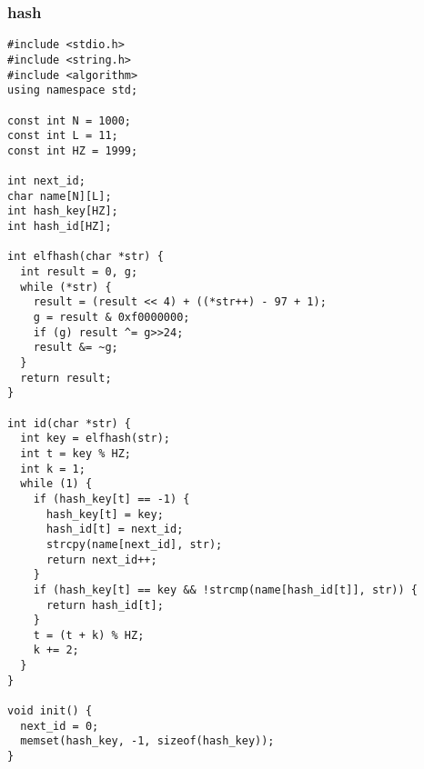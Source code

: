 \subsubsection{hash}
\begin{verbatim}
#include <stdio.h>
#include <string.h>
#include <algorithm>
using namespace std;

const int N = 1000;
const int L = 11;
const int HZ = 1999;

int next_id;
char name[N][L];
int hash_key[HZ];
int hash_id[HZ];

int elfhash(char *str) {
  int result = 0, g;
  while (*str) {
    result = (result << 4) + ((*str++) - 97 + 1);
    g = result & 0xf0000000;
    if (g) result ^= g>>24;
    result &= ~g;
  }
  return result;
}

int id(char *str) {
  int key = elfhash(str);
  int t = key % HZ;
  int k = 1;
  while (1) {
    if (hash_key[t] == -1) {
      hash_key[t] = key;
      hash_id[t] = next_id;
      strcpy(name[next_id], str);
      return next_id++;
    }
    if (hash_key[t] == key && !strcmp(name[hash_id[t]], str)) {
      return hash_id[t];
    }
    t = (t + k) % HZ;
    k += 2;
  }
}

void init() {
  next_id = 0;
  memset(hash_key, -1, sizeof(hash_key));
}
\end{verbatim}
